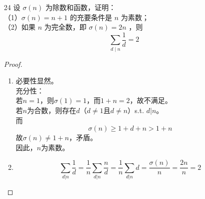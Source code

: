 \begin{enumerate}
\begin{proof}
\begin{enumerate}
            \item 
            \begin{align*}
                \sum\limits_{n\leq x}\log n &= \sum\limits_{n\leq x}\sum\limits_{d|n}\Lambda(d)\\
                &= \sum\limits_{d\leq x}\Lambda(d)\sum\limits_{k\leq \frac{x}{d}}1\\
                &= \sum\limits_{d\leq x}\Lambda(d)\left[\frac{x}{d}\right]
            \end{align*}
        \end{enumerate}
    \end{proof}
    \item[24]  设 $\sigma(n)$ 为除数和函数，证明：\\
    （1）$\sigma(n)=n+1$ 的充要条件是 $n$ 为素数；\\
    （2）如果 $n$ 为完全数，即 $\sigma(n)=2 n$ ，则
\begin{equation*}
    \sum_{d \mid n} \frac{1}{d}=2
\end{equation*}
    \begin{proof}
        \begin{enumerate}
            \item 必要性显然。\\
            充分性：\\
            若$n=1$，则$\sigma(1)=1$，而$1+n=2$，故不满足。\\
            若$n$为合数，则存在$d$（$d\neq 1$且$d\neq n$）s.t. $d|n$。\\
            而
            \[\sigma(n)\geq 1+d+n>1+n\]
            故$\sigma(n)\neq 1+n$，矛盾。\\
            因此，$n$为素数。
            
            \item 
            \[\sum\limits_{d|n}\frac{1}{d}=\frac{1}{n}\sum\limits_{d|n}\frac{n}{d}=\frac{1}{n}\sum\limits_{d|n}d=\frac{\sigma(n)}{n}=\frac{2n}{n}=2\]
        \end{enumerate}
    \end{proof}
\end{enumerate}